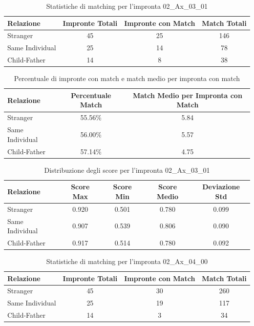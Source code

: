 \begin{table}[htbp]
\centering
\caption{Statistiche di matching per l'impronta 02\_Ax\_03\_01}
\label{tab:results_02_Ax_03_01}
\begin{tabular}{|l|c|c|c|}
\hline
\textbf{Relazione} & \textbf{Impronte Totali} & \textbf{Impronte con Match} & \textbf{Match Totali} \\
\hline
Stranger & 45 & 25 & 146 \\
\hline
Same Individual & 25 & 14 & 78 \\
\hline
Child-Father & 14 & 8 & 38 \\
\hline
\end{tabular}
\end{table}


\begin{table}[htbp]
\centering
\caption{Percentuale di impronte con match e match medio per impronta con match}
\label{tab:match_percentage_02_Ax_03_01}
\begin{tabular}{|l|c|c|}
\hline
\textbf{Relazione} & \textbf{Percentuale Match} & \textbf{Match Medio per Impronta con Match} \\
\hline
Stranger & 55.56\% & 5.84 \\
\hline
Same Individual & 56.00\% & 5.57 \\
\hline
Child-Father & 57.14\% & 4.75 \\
\hline
\end{tabular}
\end{table}


\begin{table}[htbp]
\centering
\caption{Distribuzione degli score per l'impronta 02\_Ax\_03\_01}
\label{tab:scores_02_Ax_03_01}
\begin{tabular}{|l|c|c|c|c|}
\hline
\textbf{Relazione} & \textbf{Score Max} & \textbf{Score Min} & \textbf{Score Medio} & \textbf{Deviazione Std} \\
\hline
Stranger & 0.920 & 0.501 & 0.780 & 0.099 \\
\hline
Same Individual & 0.907 & 0.539 & 0.806 & 0.090 \\
\hline
Child-Father & 0.917 & 0.514 & 0.780 & 0.092 \\
\hline
\end{tabular}
\end{table}


\begin{table}[htbp]
\centering
\caption{Statistiche di matching per l'impronta 02\_Ax\_04\_00}
\label{tab:results_02_Ax_04_00}
\begin{tabular}{|l|c|c|c|}
\hline
\textbf{Relazione} & \textbf{Impronte Totali} & \textbf{Impronte con Match} & \textbf{Match Totali} \\
\hline
Stranger & 45 & 30 & 260 \\
\hline
Same Individual & 25 & 19 & 117 \\
\hline
Child-Father & 14 & 3 & 34 \\
\hline
\end{tabular}
\end{table}


